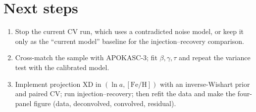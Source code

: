 \documentclass[11pt,a4paper]{article}
\newcommand{\feh}{\ensuremath{[\mathrm{Fe/H}]}}
\begin{document}
\section{Next steps}
\begin{enumerate}
  \item Stop the current CV run, which uses a contradicted noise model, or keep it only as the ``current model'' baseline for the injection--recovery comparison.
  \item Cross-match the sample with APOKASC-3; fit $\beta,\gamma,\tau$ and repeat the variance test with the calibrated model.
  \item Implement projection XD in $(\ln a,\feh)$ with an inverse-Wishart prior and paired CV; run injection--recovery; then refit the data and make the four-panel figure (data, deconvolved, convolved, residual).
\end{enumerate}
\end{document}
